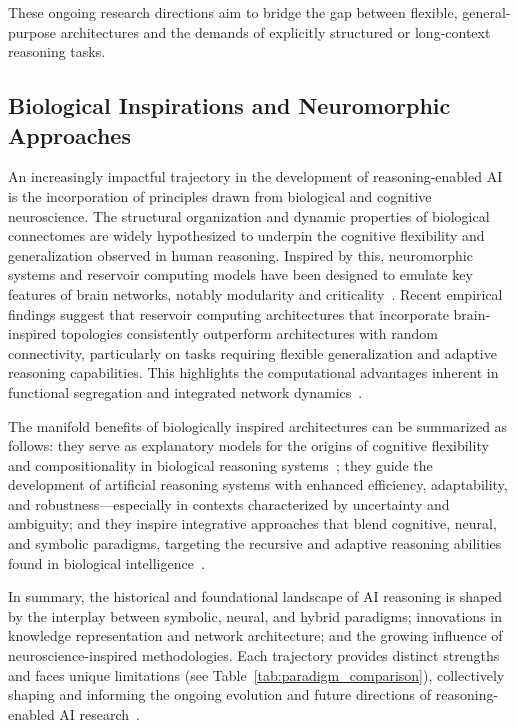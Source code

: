 \documentclass[sigconf]{acmart}
\begin{document}
These ongoing research directions aim to bridge the gap between flexible, general-purpose architectures and the demands of explicitly structured or long-context reasoning tasks.

\subsection{Biological Inspirations and Neuromorphic Approaches}

An increasingly impactful trajectory in the development of reasoning-enabled AI is the incorporation of principles drawn from biological and cognitive neuroscience. The structural organization and dynamic properties of biological connectomes are widely hypothesized to underpin the cognitive flexibility and generalization observed in human reasoning. Inspired by this, neuromorphic systems and reservoir computing models have been designed to emulate key features of brain networks, notably modularity and criticality~\cite{ref90}. Recent empirical findings suggest that reservoir computing architectures that incorporate brain-inspired topologies consistently outperform architectures with random connectivity, particularly on tasks requiring flexible generalization and adaptive reasoning capabilities. This highlights the computational advantages inherent in functional segregation and integrated network dynamics~\cite{ref90}.

The manifold benefits of biologically inspired architectures can be summarized as follows: they serve as explanatory models for the origins of cognitive flexibility and compositionality in biological reasoning systems~\cite{ref90}; they guide the development of artificial reasoning systems with enhanced efficiency, adaptability, and robustness---especially in contexts characterized by uncertainty and ambiguity; and they inspire integrative approaches that blend cognitive, neural, and symbolic paradigms, targeting the recursive and adaptive reasoning abilities found in biological intelligence~\cite{ref49,ref90}.

In summary, the historical and foundational landscape of AI reasoning is shaped by the interplay between symbolic, neural, and hybrid paradigms; innovations in knowledge representation and network architecture; and the growing influence of neuroscience-inspired methodologies. Each trajectory provides distinct strengths and faces unique limitations (see Table~\ref{tab:paradigm_comparison}), collectively shaping and informing the ongoing evolution and future directions of reasoning-enabled AI research~\cite{ref42,ref49,ref54,ref86,ref90,ref100}.
\end{document}
